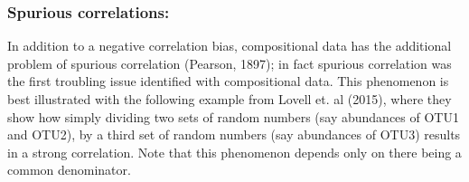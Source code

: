 \documentclass[twocolumn]{article}
\newenvironment{Shaded}{\begin{snugshade}}{\end{snugshade}}
\newcommand{\KeywordTok}[1]{\textcolor[rgb]{0.13,0.29,0.53}{\textbf{{#1}}}}
\newcommand{\DataTypeTok}[1]{\textcolor[rgb]{0.13,0.29,0.53}{{#1}}}
\newcommand{\DecValTok}[1]{\textcolor[rgb]{0.00,0.00,0.81}{{#1}}}
\newcommand{\FloatTok}[1]{\textcolor[rgb]{0.00,0.00,0.81}{{#1}}}
\newcommand{\StringTok}[1]{\textcolor[rgb]{0.31,0.60,0.02}{{#1}}}
\newcommand{\NormalTok}[1]{{#1}}
\begin{document}
\subsubsection{Spurious correlations:}\label{spurious-correlations}

In addition to a negative correlation bias, compositional data has the
additional problem of spurious correlation (Pearson, 1897); in fact
spurious correlation was the first troubling issue identified with
compositional data. This phenomenon is best illustrated with the
following example from Lovell et. al (2015), where they show how simply
dividing two sets of random numbers (say abundances of OTU1 and OTU2),
by a third set of random numbers (say abundances of OTU3) results in a
strong correlation. Note that this phenomenon depends only on there
being a common denominator.

\begin{Shaded}
\end{Shaded}
\end{document}
